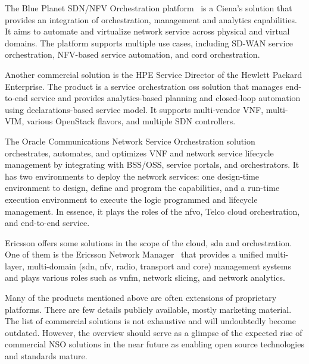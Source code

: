 The Blue Planet SDN/NFV Orchestration platform~\cite{BluePlanet2017BLUESUITE} is a Ciena's solution that provides an integration of orchestration, management and analytics capabilities. It aims to automate and virtualize network service across physical and virtual domains. The platform supports multiple use cases, including SD-WAN service orchestration, NFV-based service automation, and \gls{cord} orchestration.

Another commercial solution is the HPE Service Director of the Hewlett Packard Enterprise. The product is a service orchestration \gls{oss} solution that manages end-to-end service and provides analytics-based planning and closed-loop automation using declarations-based service model. It supports multi-vendor VNF, multi-VIM, various OpenStack flavors, and multiple SDN controllers.

The Oracle Communications Network Service Orchestration solution~\cite{OracleCommunicationsOracleSolution} orchestrates, automates, and optimizes VNF and network service lifecycle management by integrating with BSS/OSS, service portals, and orchestrators. It has two environments to deploy the network services: one design-time environment to design, define and program the capabilities, and a run-time execution environment to execute the logic programmed and lifecycle management. In essence, it plays the roles of the \gls{nfvo}, Telco cloud orchestration, and end-to-end service.  

Ericsson offers some solutions in the scope of the cloud, \gls{sdn} and orchestration. One of them is the Ericsson Network Manager~\cite{EricssonInc.EricssonManager} that provides a unified multi-layer, multi-domain (\gls{sdn}, \gls{nfv}, radio, transport and core) management systems and plays various roles such as \gls{vnfm}, network slicing, and network analytics. 

Many of the products mentioned above are often extensions of proprietary platforms. There are few details publicly available, mostly marketing material. The list of commercial solutions is not exhaustive and will undoubtedly become outdated. However, the overview should serve as a glimpse of the expected rise of commercial NSO solutions in the near future as enabling open source technologies and standards mature.
